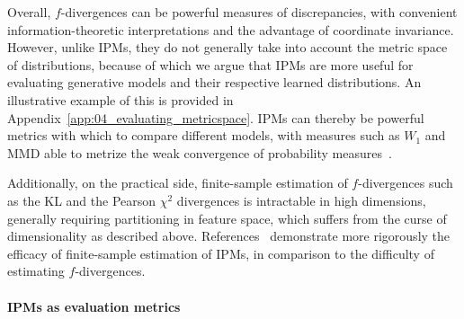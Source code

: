 
Overall, $f$-divergences can be powerful measures of discrepancies, with convenient information-theoretic interpretations and the advantage of coordinate invariance.
However, unlike IPMs, they do not generally take into account the metric space of distributions, because of which we argue that IPMs are more useful for evaluating generative models and their respective learned distributions.
An illustrative example of this is provided in Appendix~\ref{app:04_evaluating_metricspace}.
IPMs can thereby be powerful metrics with which to compare different models, with measures such as $W_1$ and MMD able to metrize the weak convergence of probability measures~\cite{villani_ot, simongabriel_mmdmetrizing}.


Additionally, on the practical side, finite-sample estimation of $f$-divergences such as the KL and the Pearson $\chi^2$ divergences is intractable in high dimensions, generally requiring partitioning in feature space, which suffers from the curse of dimensionality as described above.
References~\cite{sriperumbudur_empirical, sriperumbudur_ipms} demonstrate more rigorously the efficacy of finite-sample estimation of IPMs, in comparison to the difficulty of estimating $f$-divergences.

\paragraph{IPMs as evaluation metrics}
\label{sec:04_evaluating_ipms}

